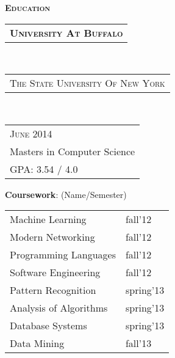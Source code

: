 \documentclass[10pt,a4paper,oneside]{article}
\begin{document}
    \textcolor{light-gray}{\textbf{\large E\textsc{ducation}}}
    \vspace{4pt}\\
    \begin{tabular}{c}
        \textbf{\normalsize U\textsc{niversity} A\textsc{t} B\textsc{uffalo}}
    \end{tabular}\\
    \textcolor{light-gray}{
        \begin{tabular}{l}
            {\small T\textsc{he} S\textsc{tate} U\textsc{niversity} O\textsc{f} N\textsc{ew} Y\textsc{ork}}
        \end{tabular}
    }\\ 
    \begin{tabular}{l}
        {\small J\textsc{une} 2014}\\
        {\small Masters in Computer Science }\\
        {\small GPA: 3.54 / 4.0}
    \end{tabular}
    \vspace{0pt}
    \begin{adjustwidth}{7pt}{0pt}
        {\small \textbf{Coursework}: (Name/Semester)}\\
    \end{adjustwidth}
    \vspace{-11pt}
    \begin{adjustwidth}{7pt}{0pt}
        \begin{tabular}{ll}
            { \footnotesize Machine Learning } & {\footnotesize fall'12}\\                
            { \footnotesize Modern Networking } & {\footnotesize fall'12}\\
            { \footnotesize Programming Languages } & {\footnotesize fall'12}\\
            { \footnotesize Software Engineering } & {\footnotesize fall'12}\\
            { \footnotesize Pattern Recognition } & {\footnotesize spring'13}\\
            { \footnotesize Analysis of Algorithms } & {\footnotesize spring'13}\\
            { \footnotesize Database Systems } & {\footnotesize spring'13}\\
            { \footnotesize Data Mining } & {\footnotesize fall'13}\\
        \end{tabular}
    \end{adjustwidth}
\end{document}
